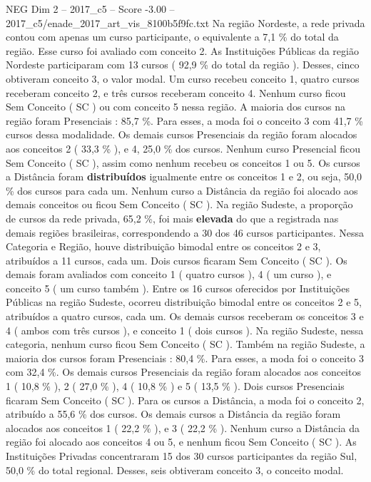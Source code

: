 \begin{textsample}{NEG Dim 2 – 2017\_c5 – Score -3.00 – 2017\_c5/enade\_2017\_art\_vis\_8100b5f9fc.txt}
Na região Nordeste, a rede privada contou com apenas um curso participante, o equivalente a 7,1 \% do total da região.
Esse curso foi avaliado com conceito 2.
As Instituições Públicas da região Nordeste participaram com 13 cursos ( 92,9 \% do total da região ).
Desses, cinco obtiveram conceito 3, o valor modal.
Um curso recebeu conceito 1, quatro cursos receberam conceito 2, e três cursos receberam conceito 4.
Nenhum curso ficou Sem Conceito ( SC ) ou com conceito 5 nessa região.
A maioria dos cursos na região foram Presenciais : 85,7 \%.
Para esses, a moda foi o conceito 3 com 41,7 \% cursos dessa modalidade.
Os demais cursos Presenciais da região foram alocados aos conceitos 2 ( 33,3 \% ), e 4, 25,0 \% dos cursos.
Nenhum curso Presencial ficou Sem Conceito ( SC ), assim como nenhum recebeu os conceitos 1 ou 5.
Os cursos a Distância foram \textbf{distribuídos} igualmente entre os conceitos 1 e 2, ou seja, 50,0 \% dos cursos para cada um.
Nenhum curso a Distância da região foi alocado aos demais conceitos ou ficou Sem Conceito ( SC ).
Na região Sudeste, a proporção de cursos da rede privada, 65,2 \%, foi mais \textbf{elevada} do que a registrada nas demais regiões brasileiras, correspondendo a 30 dos 46 cursos participantes.
Nessa Categoria e Região, houve distribuição bimodal entre os conceitos 2 e 3, atribuídos a 11 cursos, cada um.
Dois cursos ficaram Sem Conceito ( SC ).
Os demais foram avaliados com conceito 1 ( quatro cursos ), 4 ( um curso ), e conceito 5 ( um curso também ).
Entre os 16 cursos oferecidos por Instituições Públicas na região Sudeste, ocorreu distribuição bimodal entre os conceitos 2 e 5, atribuídos a quatro cursos, cada um.
Os demais cursos receberam os conceitos 3 e 4 ( ambos com três cursos ), e conceito 1 ( dois cursos ).
Na região Sudeste, nessa categoria, nenhum curso ficou Sem Conceito ( SC ).
Também na região Sudeste, a maioria dos cursos foram Presenciais : 80,4 \%.
Para esses, a moda foi o conceito 3 com 32,4 \%.
Os demais cursos Presenciais da região foram alocados aos conceitos 1 ( 10,8 \% ), 2 ( 27,0 \% ), 4 ( 10,8 \% ) e 5 ( 13,5 \% ).
Dois cursos Presenciais ficaram Sem Conceito ( SC ).
Para os cursos a Distância, a moda foi o conceito 2, atribuído a 55,6 \% dos cursos.
Os demais cursos a Distância da região foram alocados aos conceitos 1 ( 22,2 \% ), e 3 ( 22,2 \% ).
Nenhum curso a Distância da região foi alocado aos conceitos 4 ou 5, e nenhum ficou Sem Conceito ( SC ).
As Instituições Privadas concentraram 15 dos 30 cursos participantes da região Sul, 50,0 \% do total regional.
Desses, seis obtiveram conceito 3, o conceito modal.

\end{textsample}

